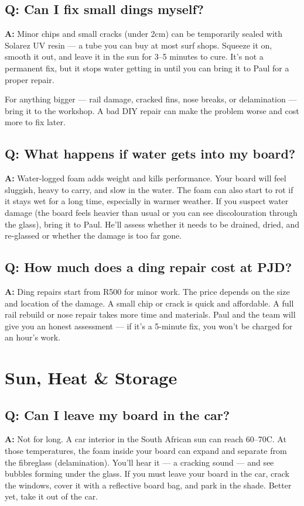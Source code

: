 \documentclass[11pt,a4paper]{article}
\newcommand{\question}[1]{\subsection*{Q: #1}}
\newcommand{\answer}{\noindent\textbf{A:} }
\begin{document}
\question{Can I fix small dings myself?}
\answer Minor chips and small cracks (under 2cm) can be temporarily sealed with Solarez UV resin --- a tube you can buy at most surf shops. Squeeze it on, smooth it out, and leave it in the sun for 3--5 minutes to cure. It's not a permanent fix, but it stops water getting in until you can bring it to Paul for a proper repair.

For anything bigger --- rail damage, cracked fins, nose breaks, or delamination --- bring it to the workshop. A bad DIY repair can make the problem worse and cost more to fix later.

\question{What happens if water gets into my board?}
\answer Water-logged foam adds weight and kills performance. Your board will feel sluggish, heavy to carry, and slow in the water. The foam can also start to rot if it stays wet for a long time, especially in warmer weather. If you suspect water damage (the board feels heavier than usual or you can see discolouration through the glass), bring it to Paul. He'll assess whether it needs to be drained, dried, and re-glassed or whether the damage is too far gone.

\question{How much does a ding repair cost at PJD?}
\answer Ding repairs start from R500 for minor work. The price depends on the size and location of the damage. A small chip or crack is quick and affordable. A full rail rebuild or nose repair takes more time and materials. Paul and the team will give you an honest assessment --- if it's a 5-minute fix, you won't be charged for an hour's work.

\section{Sun, Heat \& Storage}

\question{Can I leave my board in the car?}
\answer Not for long. A car interior in the South African sun can reach 60--70\textdegree C. At those temperatures, the foam inside your board can expand and separate from the fibreglass (delamination). You'll hear it --- a cracking sound --- and see bubbles forming under the glass. If you must leave your board in the car, crack the windows, cover it with a reflective board bag, and park in the shade. Better yet, take it out of the car.
\end{document}
